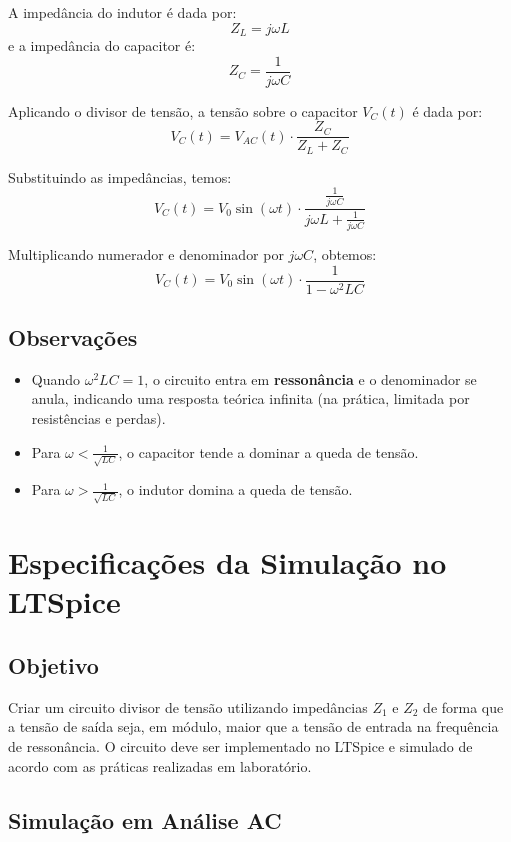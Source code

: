\begin{table}[H]
\begin{center}
A impedância do indutor é dada por:
\[
Z_L = j\omega L
\]
e a impedância do capacitor é:
\[
Z_C = \frac{1}{j\omega C}
\]

Aplicando o divisor de tensão, a tensão sobre o capacitor \( V_C(t) \) é dada por:
\[
V_C(t) = V_{AC}(t) \cdot \frac{Z_C}{Z_L + Z_C}
\]

Substituindo as impedâncias, temos:
\[
V_C(t) = V_0 \sin(\omega t) \cdot \frac{\frac{1}{j\omega C}}{j\omega L + \frac{1}{j\omega C}}
\]

Multiplicando numerador e denominador por \( j\omega C \), obtemos:
\[
V_C(t) = V_0 \sin(\omega t) \cdot \frac{1}{1 - \omega^2 LC}
\]
\end{center}

\subsection*{Observações}
\begin{itemize}
    \item Quando \( \omega^2 LC = 1 \), o circuito entra em \textbf{ressonância} e o denominador se anula, indicando uma resposta teórica infinita (na prática, limitada por resistências e perdas).
    \item Para \( \omega < \frac{1}{\sqrt{LC}} \), o capacitor tende a dominar a queda de tensão.
    \item Para \( \omega > \frac{1}{\sqrt{LC}} \), o indutor domina a queda de tensão.
\end{itemize}
\newpage
\section{Especificações da Simulação no LTSpice}
\label{sec:especificacoes}

\subsection*{Objetivo}

Criar um circuito divisor de tensão utilizando impedâncias $Z_1$ e $Z_2$ de forma que a tensão de saída seja, em módulo, maior que a tensão de entrada na frequência de ressonância. O circuito deve ser implementado no LTSpice e simulado de acordo com as práticas realizadas em laboratório.

\subsection*{Simulação em Análise AC}


\end{table}
